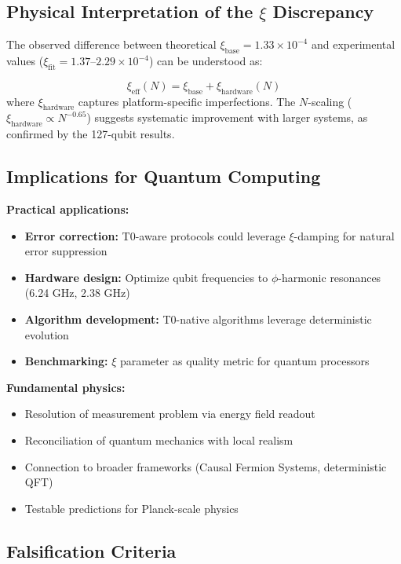 \subsection{Physical Interpretation of the $\xi$ Discrepancy}

The observed difference between theoretical $\xi_{\text{base}} = 1.33 \times 10^{-4}$ and experimental values ($\xi_{\text{fit}} = 1.37$--$2.29 \times 10^{-4}$) can be understood as:

\begin{equation}
	\xi_{\text{eff}}(N) = \xi_{\text{base}} + \xi_{\text{hardware}}(N)
\end{equation}
where $\xi_{\text{hardware}}$ captures platform-specific imperfections. The $N$-scaling ($\xi_{\text{hardware}} \propto N^{-0.65}$) suggests systematic improvement with larger systems, as confirmed by the 127-qubit results.

\subsection{Implications for Quantum Computing}

\textbf{Practical applications:}
\begin{itemize}
	\item \textbf{Error correction:} T0-aware protocols could leverage $\xi$-damping for natural error suppression
	\item \textbf{Hardware design:} Optimize qubit frequencies to $\phi$-harmonic resonances (6.24 GHz, 2.38 GHz)
	\item \textbf{Algorithm development:} T0-native algorithms leverage deterministic evolution
	\item \textbf{Benchmarking:} $\xi$ parameter as quality metric for quantum processors
\end{itemize}

\textbf{Fundamental physics:}
\begin{itemize}
	\item Resolution of measurement problem via energy field readout
	\item Reconciliation of quantum mechanics with local realism
	\item Connection to broader frameworks (Causal Fermion Systems, deterministic QFT)
	\item Testable predictions for Planck-scale physics
\end{itemize}

\subsection{Falsification Criteria}

